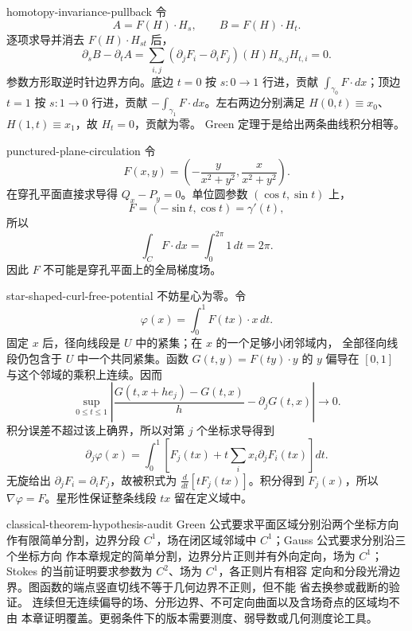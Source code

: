 \begin{solution}{homotopy-invariance-pullback}
令
\[
 A=F(H)\cdot H_s,\qquad B=F(H)\cdot H_t.
\]
逐项求导并消去 \(F(H)\cdot H_{st}\) 后，
\[
 \partial_sB-\partial_tA
 =\sum_{i,j}
  (\partial_jF_i-\partial_iF_j)(H)H_{s,j}H_{t,i}=0.
\]
参数方形取逆时针边界方向。底边 \(t=0\) 按 \(s:0\to1\) 行进，贡献
\(\int_{\gamma_0}F\cdot dx\)；顶边 \(t=1\) 按 \(s:1\to0\) 行进，贡献
\(-\int_{\gamma_1}F\cdot dx\)。左右两边分别满足
\(H(0,t)\equiv x_0\)、\(H(1,t)\equiv x_1\)，故 \(H_t=0\)，贡献为零。
Green 定理于是给出两条曲线积分相等。
\end{solution}

\begin{solution}{punctured-plane-circulation}
令
\[
 F(x,y)=\left(-\frac{y}{x^2+y^2},
               \frac{x}{x^2+y^2}\right).
\]
在穿孔平面直接求导得 \(Q_x-P_y=0\)。单位圆参数
\((\cos t,\sin t)\) 上，
\[
 F=(-\sin t,\cos t)=\gamma'(t),
\]
所以
\[
 \int_C F\cdot dx=\int_0^{2\pi}1\,dt=2\pi.
\]
因此 \(F\) 不可能是穿孔平面上的全局梯度场。
\end{solution}

\begin{solution}{star-shaped-curl-free-potential}
不妨星心为零。令
\[
 \varphi(x)=\int_0^1F(tx)\cdot x\,dt.
\]
固定 $x$ 后，径向线段是 $U$ 中的紧集；在 $x$ 的一个足够小闭邻域内，
全部径向线段仍包含于 $U$ 中一个共同紧集。函数 $G(t,y)=F(ty)\cdot y$
的 $y$ 偏导在 $[0,1]$ 与这个邻域的乘积上连续。因而
\[
 \sup_{0\le t\le1}
 \left|\frac{G(t,x+he_j)-G(t,x)}h-\partial_jG(t,x)\right|\to0.
\]
积分误差不超过该上确界，所以对第 \(j\) 个坐标求导得到
\[
 \partial_j\varphi(x)
 =\int_0^1\left[
 F_j(tx)+t\sum_i x_i\partial_jF_i(tx)\right]dt.
\]
无旋给出 \(\partial_jF_i=\partial_iF_j\)，故被积式为
\(\frac d{dt}[tF_j(tx)]\)。积分得到 \(F_j(x)\)，所以
\(\nabla\varphi=F\)。星形性保证整条线段 \(tx\) 留在定义域中。
\end{solution}

\begin{solution}{classical-theorem-hypothesis-audit}
Green 公式要求平面区域分别沿两个坐标方向作有限简单分割，边界分段
\(C^1\)，场在闭区域邻域中 \(C^1\)；Gauss 公式要求分别沿三个坐标方向
作本章规定的简单分割，边界分片正则并有外向定向，场为 \(C^1\)；
Stokes 的当前证明要求参数为 \(C^2\)、场为 \(C^1\)，各正则片有相容
定向和分段光滑边界。图函数的端点竖直切线不等于几何边界不正则，但不能
省去换参或截断的验证。
连续但无连续偏导的场、分形边界、不可定向曲面以及含场奇点的区域均不由
本章证明覆盖。更弱条件下的版本需要测度、弱导数或几何测度论工具。
\end{solution}
